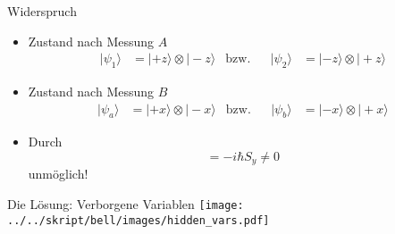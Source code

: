 \documentclass{beamer}
\begin{document}
\begin{frame}{Widerspruch}
    \begin{itemize}
        \item Zustand nach Messung $A$
            \begin{align*}
                |\psi_{1}\rangle &= |{+}z\rangle \otimes |{-}z\rangle
                & \text{bzw.} && 
                |\psi_{2}\rangle &= |{-}z\rangle \otimes |{+}z\rangle
            \end{align*}
        \item Zustand nach Messung $B$
            \begin{align*}
                |\psi_{a}\rangle &= |{+}x\rangle \otimes |{-}x\rangle
                & \text{bzw.} && 
                |\psi_{b}\rangle &= |{-}x\rangle \otimes |{+}x\rangle
            \end{align*}
        \item<2-> Durch
            \begin{equation*}
                [S_x, S_z] =  -i \hbar S_y \neq 0
            \end{equation*}
            unm\"oglich!
    \end{itemize}
\end{frame}
\begin{frame}{Die L\"osung: Verborgene Variablen}
    \centering
    \texttt{[image: ../../skript/bell/images/hidden\_vars.pdf]}
\end{frame}
\end{document}
